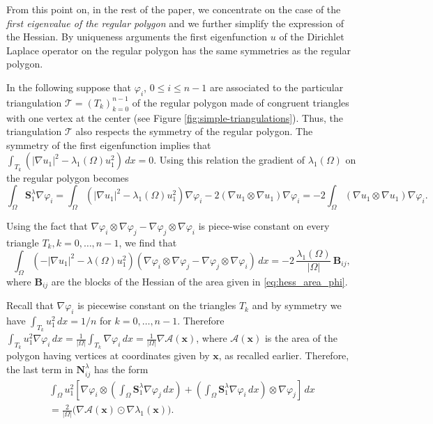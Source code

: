 \documentclass[11pt]{article}
\numberwithin{equation}{section}\newtheorem*{jepEnonce}{\jepEnonceTitle}\newenvironment{enonce*}[1]{\def\jepEnonceTitle{#1}\jepEnonce}{\endjepEnonce}\newtheorem*{conj*}{Conjecture}
\theoremstyle{plain}
\theoremstyle{definition}
\newcommand{\bo}[1]{{\boldsymbol#1}}
\begin{document}
From this point on, in the rest of the paper, we concentrate on the case of the \emph{first eigenvalue of the regular polygon} and we further simplify the expression of the Hessian. By uniqueness arguments the first eigenfunction $u$ of the Dirichlet Laplace operator on the regular polygon has the same symmetries as the regular polygon.

In the following suppose that $\varphi_i$, $0 \leq i \leq n-1$ are associated to the particular triangulation $\mathcal T=(T_k)_{k=0}^{n-1}$ of the regular polygon made of congruent triangles with one vertex at the center (see Figure \ref{fig:simple-triangulations}). Thus, the triangulation $\mathcal T$ also respects the symmetry of the regular polygon. The symmetry of the first eigenfunction implies that $\int_{T_k}(|\nabla u_1|^2-\lambda_1(\Omega) u_1^2)\, dx=0$. Using this relation the gradient of $\lambda_1(\Omega)$ on the regular polygon becomes
\[
\int_\Omega \bo S_1^\lambda \nabla \varphi_i = \int_\Omega (|\nabla u_1|^2-\lambda_1(\Omega) u_1^2)\nabla \varphi_i - 2 (\nabla u_1 \otimes \nabla u_1) \nabla \varphi_i = -2 \int_\Omega (\nabla u_1 \otimes \nabla u_1) \nabla \varphi_i.
\]

Using the fact that $\nabla \varphi_i \otimes \nabla \varphi_j-\nabla \varphi_j \otimes \nabla \varphi_i$ is piece-wise constant on every triangle $T_k, k=0,\dots,n-1$, we find that
\[
\int_\Omega \left(-|\nabla u_1|^2-\lambda(\Omega) u_1^2\right) (\nabla \varphi_i \otimes \nabla \varphi_j-\nabla \varphi_j \otimes \nabla \varphi_i) \, dx = -2\,\frac{\lambda_1(\Omega)}{|\Omega|}\, \bo B_{ij},
\]
where $\bo B_{ij}$ are the blocks of the Hessian of the area given in \eqref{eq:hess_area_phi}.

Recall that $\nabla \varphi_i$ is piecewise constant on the triangles $T_k$ and by symmetry we have $\int_{T_k} u_1^2\, dx = 1/n$ for $k=0,\dots,n-1$. Therefore $\int_{T_k} u_1^2 \nabla \varphi_i\, dx = \frac{1}{|\Omega|} \int_{T_k}\nabla \varphi_i\, dx=\frac{1}{|\Omega|} \nabla \mathcal A(\bo x)$, where $\mathcal A(\bo x)$ is the area of the polygon having vertices at coordinates given by $\bo x$, as recalled earlier. Therefore, the last term in $\bo N_{ij}^\lambda$ has the form
\vspace*{-5pt}
\begin{multline*}
\int_\Omega u_1^2\left[\nabla \varphi_i \otimes \left(\int_\Omega \bo S_1^\lambda \nabla \varphi_j\, dx \right)+
\left(\int_\Omega \bo S_1^\lambda \nabla \varphi_i\, dx \right)\otimes \nabla \varphi_j \right]\, dx \\
= \frac{2}{|\Omega|} \bigl(\nabla \mathcal A(\bo x) \odot \nabla \lambda_1(\bo x)\bigr).
\end{multline*}
\end{document}
